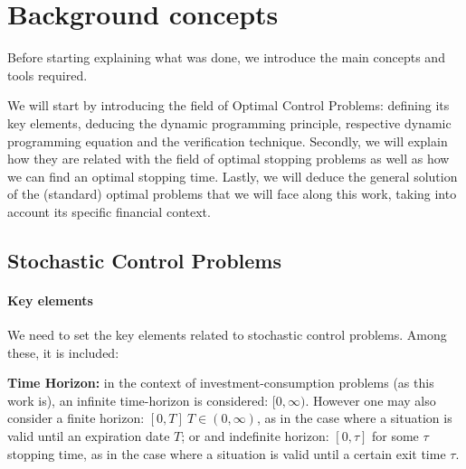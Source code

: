 
\chapter{Background concepts}
\label{chapter:bc}

Before starting explaining what was done, we introduce the main concepts and tools required.

We will start by introducing the field of Optimal Control Problems: defining its key elements, deducing the dynamic programming principle, respective dynamic programming equation and the verification technique. Secondly, we will explain how they are related with the field of optimal stopping problems as well as how we can find an optimal stopping time. Lastly, we will deduce the general solution of the (standard) optimal problems that we will face along this work, taking into account its specific financial context.


\section{Stochastic Control Problems}
\label{section:control}

\subsubsection{Key elements}

We need to set the key elements related to stochastic control problems. Among these, it is included:

\textbf{Time Horizon:}
in the context of investment-consumption problems (as this work is), an infinite time-horizon is considered: $[0,\infty)$. However one may also consider a finite horizon: $[0,T] \ T \in(0,\infty)$, as in the case where a situation is valid until an expiration date $T$; or and indefinite horizon: $[0,\tau]$ for some $\tau$ stopping time, as in the case where a situation is valid until a certain exit time $\tau$.


